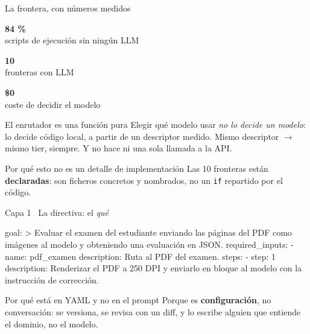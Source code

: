 \documentclass[aspectratio=169,11pt]{beamer}
\newcommand{\cifra}[2]{%
  \begin{minipage}[t]{0.30\textwidth}\centering
  {\fontsize{28}{30}\selectfont\bfseries\color{azulNoche}#1}\\[3pt]
  {\footnotesize\color{grisTexto}#2}
  \end{minipage}}
\begin{document}
\begin{frame}{La frontera, con números medidos}
  \vspace{2pt}
  \cifra{84 \%}{scripts de ejecución sin ningún LLM}
  \hfill
  \cifra{10}{fronteras con LLM}
  \hfill
  \cifra{\$0}{coste de decidir el modelo}
  \par\vspace{14pt}
  \begin{block}{El enrutador es una función pura}
    Elegir qué modelo usar \emph{no lo decide un modelo}: lo decide código local,
    a partir de un descriptor medido. Mismo descriptor $\rightarrow$ mismo tier,
    siempre. Y no hace ni una sola llamada a la API.
  \end{block}
  \begin{alertblock}{Por qué esto no es un detalle de implementación}
    Las 10 fronteras están \textbf{declaradas}: son ficheros
    concretos y nombrados, no un \texttt{if} repartido por el código.
  \end{alertblock}
\end{frame}

\begin{frame}{Capa 1 \textbullet\ La directiva: el \emph{qué}}
  \begin{panelMono}
goal: >
  Evaluar el examen del estudiante enviando las páginas del PDF
  como imágenes al modelo y obteniendo una evaluación en JSON.
required\_inputs:
  - name: pdf\_examen
    description: Ruta al PDF del examen.
steps:
  - step: 1
    description: Renderizar el PDF a 250 DPI y enviarlo en bloque
                  al modelo con la instrucción de corrección.
  \end{panelMono}
  \smallskip
  \begin{block}{Por qué está en YAML y no en el prompt}
    Porque es \textbf{configuración}, no conversación: se versiona, se revisa con
    un diff, y lo escribe alguien que entiende el dominio, no el modelo.
  \end{block}
\end{frame}
\end{document}
